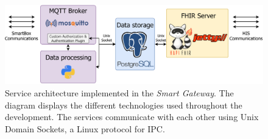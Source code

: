 \begin{figure}[H]
    \centering
    \includegraphics[width=0.8\linewidth]{images/service overview gateway.pdf}
    \caption[Service architecture implemented in the \textit{Smart Gateway}.]{Service architecture implemented in the \textit{Smart Gateway}. The diagram displays the different technologies used throughout the development. The services communicate with each other using Unix Domain Sockets, a Linux protocol for \acf{IPC}.}
    \label{fig:gateway_serviceoverview}
\end{figure}
